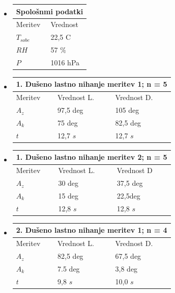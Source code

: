 \begin{itemize}
\centering
\item[]
    \begin{tabular}{|p{1.5cm}|p{1.5cm}|}
        \hline
        \multicolumn{2}{|c|}{Spološnmi podatki}\\
        \hline
        Meritev & Vrednost\\
        \hline
        $T_{sobe}$ & 22,5 C\\
        $RH$ & 57 $\%$ \\
        $P$ & 1016 hPa\\
        \hline
    \end{tabular}
\item[]
    \begin{tabular}{|p{1.5cm}|p{1.5cm}|p{1.5cm}|}
        \hline
        \multicolumn{3}{|c|}{1. Dušeno lastno nihanje meritev 1; n = 5}\\
        \hline
        Meritev & Vrednost L. & Vrednost D.\\
        \hline
        $A_z$ & 97,5 deg & 105 deg\\
        $A_k$ & 75 deg & 82,5 deg\\
        $t$ & 12,7 $s$ & 12,7 $s$\\
        \hline
    \end{tabular}
\item[]
    \begin{tabular}{|p{1.5cm}|p{1.5cm}|p{1.5cm}|}
        \hline
        \multicolumn{3}{|c|}{1. Dušeno lastno nihanje meritev 2; n = 5}\\
        \hline
        Meritev & Vrednost L. & Vrednost D\\
        \hline
        $A_z$ & 30 deg & 37,5 deg\\
        $A_k$ & 15 deg & 22,5deg\\
        $t$ & 12,8 $s$ & 12,8 $s$\\
        \hline
    \end{tabular}
\item[]
    \begin{tabular}{|p{1.5cm}|p{1.5cm}|p{1.5cm}|}
        \hline
        \multicolumn{3}{|c|}{2. Dušeno lastno nihanje meritev 1; n = 4}\\
        \hline
        Meritev & Vrednost L. & Vrednost D.\\
        \hline
        $A_z$ & 82,5 deg & 67,5 deg\\
        $A_k$ & 7.5 deg & 3,8 deg\\
        $t$ & 9,8 $s$ & 10,0 $s$\\

\end{tabular}
\end{itemize}
